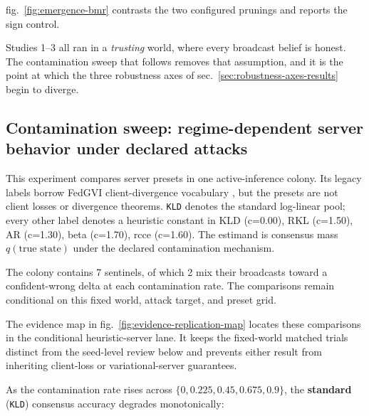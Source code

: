 \documentclass[
  english,
]{article}
\theoremstyle{plain}
\theoremstyle{definition}
\theoremstyle{remark}
\theoremstyle{definition}
\begin{document}
fig.~\ref{fig:emergence-bmr} contrasts the two configured prunings and
reports the sign control.

Studies 1--3 all ran in a \emph{trusting} world, where every broadcast
belief is honest. The contamination sweep that follows removes that
assumption, and it is the point at which the three robustness axes of
sec.~\ref{sec:robustness-axes-results} begin to diverge.

\subsection{Contamination sweep: regime-dependent server behavior under
declared attacks}\label{sec:results-robustness}

This experiment compares server presets in one active-inference colony.
Its legacy labels borrow FedGVI client-divergence vocabulary
\citep{mildner2025fedgvi}, but the presets are not client losses or
divergence theorems. \texttt{KLD} denotes the standard log-linear pool;
every other label denotes a  heuristic
constant in KLD (c=0.00), RKL (c=1.50), AR (c=1.30), beta (c=1.70), rcce
(c=1.60). The estimand is consensus mass \(q(\text{true state})\) under
the declared contamination mechanism.

The colony contains 7 sentinels, of which 2 mix their broadcasts toward
a confident-wrong delta at each contamination rate. The comparisons
remain conditional on this fixed world, attack target, and preset grid.

The evidence map in fig.~\ref{fig:evidence-replication-map} locates
these comparisons in the conditional heuristic-server lane. It keeps the
fixed-world matched trials distinct from the seed-level review below and
prevents either result from inheriting client-loss or variational-server
guarantees.

As the contamination rate rises across
\(\{0, 0.225, 0.45, 0.675, 0.9\}\), the \textbf{standard} (\texttt{KLD})
consensus accuracy degrades monotonically:
\end{document}
